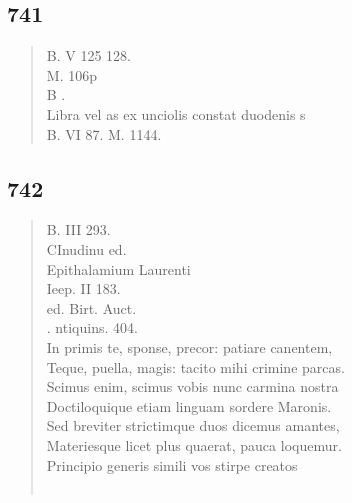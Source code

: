 \documentclass[11pt, a4paper]{report}
\begin{document}
            \subsection*{741}
      \begin{verse}
      B. V 125 128. \\ M. 106p \\ B . \\  \lbrack Libra vel as ex unciolis constat duodenis s \\ B. VI 87. M. 1144. \\ 
      \end{verse}
  
            \subsection*{742}
      \begin{verse}
      B. III 293. \\ CInudinu ed. \\ Epithalamium Laurenti \\ Ieep. II 183. \\ ed. Birt. Auct. \\ . ntiquins. 404. \\ In primis te, sponse, precor: patiare canentem, \\ Teque, puella, magis: tacito mihi crimine parcas. \\ Scimus enim, scimus vobis nunc carmina nostra \\ Doctiloquique etiam linguam sordere Maronis. \\ Sed breviter strictimque duos dicemus amantes, \\ Materiesque licet plus quaerat, pauca loquemur. \\ Principio generis simili vos stirpe creatos \\ 
        ﻿\pagebreak 

\end{verse}
\end{document}
